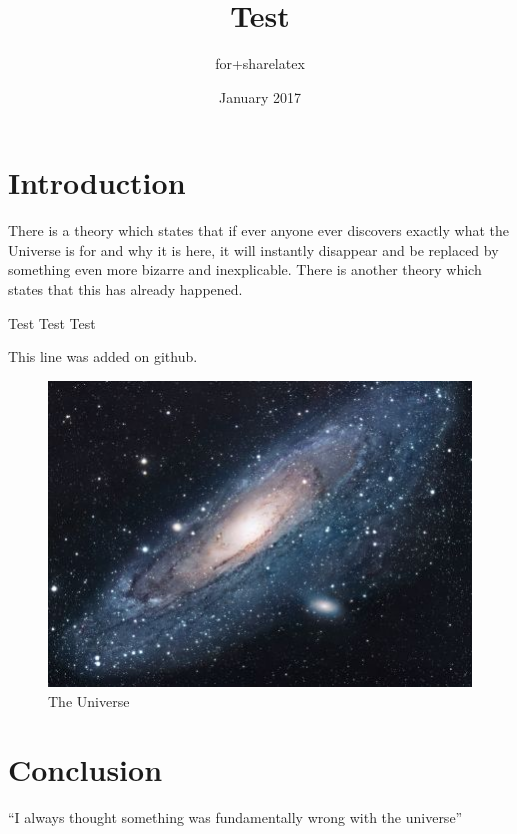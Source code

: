 \documentclass{article}
\title{Test}
\author{for+sharelatex }
\date{January 2017}
\begin{document}
\maketitle

\section{Introduction}
There is a theory which states that if ever anyone ever discovers exactly what the Universe is for and why it is here, it will instantly disappear and be replaced by something even more bizarre and inexplicable.
There is another theory which states that this has already happened.

Test Test Test \cite{adams1995hitchhiker, authorA}

This line was added on github.

\begin{figure}[h!]
\centering
\includegraphics[scale=1.7]{universe.jpg}
\caption{The Universe}
\label{fig:univerise}
\end{figure}

\section{Conclusion}
``I always thought something was fundamentally wrong with the universe'' \citep{adams1995hitchhiker}



\end{document}
